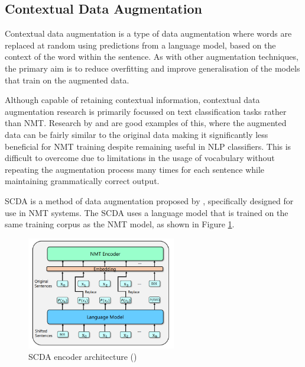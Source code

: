 \subsection{Contextual Data Augmentation}

Contextual data augmentation is a type of data augmentation where words are replaced at random using predictions from a language model, based on the context of the word within the sentence. As with other augmentation techniques, the primary aim is to reduce overfitting and improve generalisation of the models that train on the augmented data. 

Although capable of retaining contextual information, contextual data augmentation research is primarily focussed on text classification tasks rather than \acrshort{NMT}. Research by \cite{wu_conditional_2018} and \cite{kobayashi_contextual_2018} are good examples of this, where the augmented data can be fairly similar to the original data making it significantly less beneficial for \acrshort{NMT} training despite remaining useful in \acrshort{NLP} classifiers. This is difficult to overcome due to limitations in the usage of vocabulary without repeating the augmentation process many times for each sentence while maintaining grammatically correct output.

\acrfull{SCDA} is a method of data augmentation proposed by \cite{zhu_soft_2019}, specifically designed for use in \acrshort{NMT} systems. The \acrshort{SCDA} uses a language model that is trained on the same training corpus as the \acrshort{NMT} model, as shown in Figure \ref{fig:scda}.

\begin{figure}[ht!]
\centering
\includegraphics[width=0.58\textwidth]{media/literature/data_argumentation/da_scda.png}
\caption[Diagram of the \acrlong{SCDA} encoder architecture]{\acrlong{SCDA} encoder architecture (\cite{zhu_soft_2019})}
\label{fig:scda}
\end{figure}

